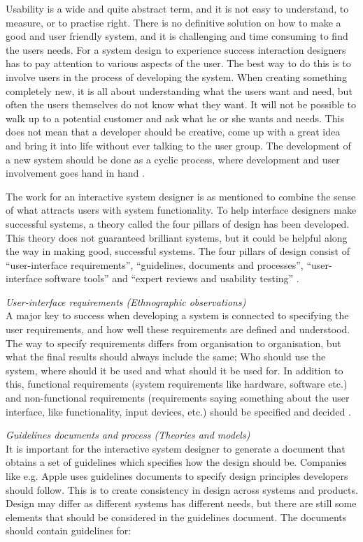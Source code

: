     
Usability is a wide and quite abstract term, and it is not easy to understand, to measure, or to practise right. There is no definitive solution on how to make a good and user friendly system, and it is challenging and time consuming to find the users needs. For a system design to experience success interaction designers has to pay attention to various aspects of the user. The best way to do this is to involve users in the process of developing the system. When creating something completely new, it is all about understanding what the users want and need, but often the users themselves do not know what they want. It will not be possible to walk up to a potential customer and ask what he or she wants and needs. This does not mean that a developer should be creative, come up with a great idea and bring it into life without ever talking to the user group. The development of a new system should be done as a cyclic process, where development and user involvement goes hand in hand \cite{mmi}.  


The work for an interactive system designer is as mentioned to combine the sense of what attracts users with system functionality. To help interface designers make successful systems, a theory called the four pillars of design has been developed. This theory does not guaranteed brilliant systems, but it could be helpful along the way in making good, successful systems. The four pillars of design consist of “user-interface requirements”, “guidelines, documents and processes”, “user-interface software tools” and “expert reviews and usability testing” \cite{mmi}.    


\emph{User-interface requirements (Ethnographic observations)}\\
A major key to success when developing a system is connected to specifying the user requirements, and how well these requirements are defined and understood.  The way to specify requirements differs from organisation to organisation, but what the final results should always include the same; Who should use the system, where should it be used and what should it be used for. In addition to this, functional requirements (system requirements like hardware,  software etc.) and non-functional requirements (requirements saying something about the user interface, like functionality, input devices, etc.) should be specified and decided \cite{mmi}.


\emph{Guidelines documents and process (Theories and models)}\\
It is important for the interactive system designer to generate a document that obtains a set of guidelines which specifies how the design should be. Companies like e.g. Apple uses guidelines documents to specify design principles developers should follow. This is to create consistency in design across systems and products. Design may differ as different systems has different needs, but there are still some elements that should be considered in the guidelines document. The documents should contain guidelines for:

